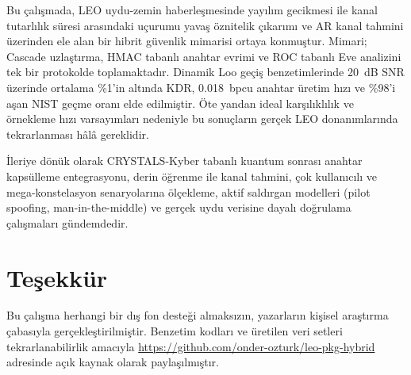 \documentclass[conference,a4paper]{IEEEtran}
\begin{document}
Bu çalışmada, LEO uydu-zemin haberleşmesinde yayılım gecikmesi ile kanal tutarlılık süresi arasındaki uçurumu yavaş öznitelik çıkarımı ve AR kanal tahmini üzerinden ele alan bir hibrit güvenlik mimarisi ortaya konmuştur. Mimari; Cascade uzlaştırma, HMAC tabanlı anahtar evrimi ve ROC tabanlı Eve analizini tek bir protokolde toplamaktadır. Dinamik Loo geçiş benzetimlerinde \SI{20}{dB} SNR üzerinde ortalama \%1'in altında KDR, \SI{0.018}{bpcu} anahtar üretim hızı ve \%98'i aşan NIST geçme oranı elde edilmiştir. Öte yandan ideal karşılıklılık ve örnekleme hızı varsayımları nedeniyle bu sonuçların gerçek LEO donanımlarında tekrarlanması hâlâ gereklidir.

İleriye dönük olarak CRYSTALS-Kyber tabanlı kuantum sonrası anahtar kapsülleme entegrasyonu, derin öğrenme ile kanal tahmini, çok kullanıcılı ve mega-konstelasyon senaryolarına ölçekleme, aktif saldırgan modelleri (pilot spoofing, man-in-the-middle) ve gerçek uydu verisine dayalı doğrulama çalışmaları gündemdedir.

\section*{Teşekkür}
Bu çalışma herhangi bir dış fon desteği almaksızın, yazarların kişisel araştırma çabasıyla gerçekleştirilmiştir. Benzetim kodları ve üretilen veri setleri tekrarlanabilirlik amacıyla \url{https://github.com/onder-ozturk/leo-pkg-hybrid} adresinde açık kaynak olarak paylaşılmıştır.
\end{document}
